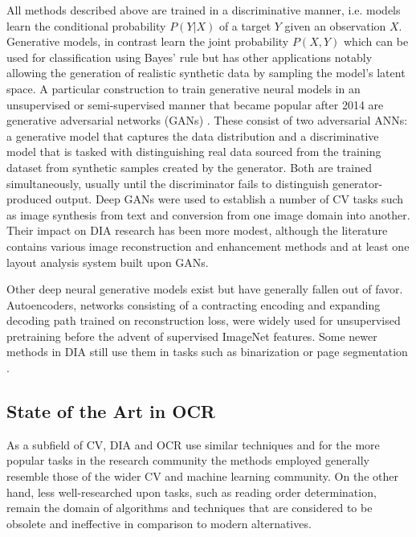 All methods described above are trained in a discriminative manner, i.e. models
learn the conditional probability $P(Y|X)$ of a target $Y$ given an observation
$X$. Generative models, in contrast learn the joint probability $P(X, Y)$ which
can be used for classification using Bayes' rule but has other applications
notably allowing the generation of realistic synthetic data by sampling the
model's latent space. A particular construction to train generative neural
models in an unsupervised or semi-supervised manner that became popular after
2014 are generative adversarial networks (GANs)
\cite{goodfellow2014generative}. These consist of two adversarial ANNs: a
generative model that captures the data distribution and a discriminative model
that is tasked with distinguishing real data sourced from the training dataset
from synthetic samples created by the generator. Both are trained
simultaneously, usually until the discriminator fails to distinguish
generator-produced output. Deep GANs were used to establish a number of CV
tasks such as image synthesis from text\cite{reed2016generative} and conversion
from one image domain into another\cite{CycleGAN2017}. Their impact on DIA
research has been more modest, although the literature contains various image
reconstruction and enhancement methods \cite{nguyen2019character,suh2020two}
and at least one layout analysis system \cite{quiros2018multi} built upon GANs.

Other deep neural generative models exist but have generally fallen out of
favor. Autoencoders, networks consisting of a contracting encoding and
expanding decoding path trained on reconstruction loss, were widely used for
unsupervised pretraining\cite{vincent2008extracting,erhan2010does} before the
advent of supervised ImageNet features. Some newer methods in DIA still use
them in tasks such as binarization \cite{calvo2019selectional} or page
segmentation \cite{chen2015page,wei2015selecting}. 

\subsection{State of the Art in OCR}
\label{s:soa}

As a subfield of CV, DIA and OCR use similar techniques and for the more
popular tasks in the research community the methods employed generally resemble
those of the wider CV and machine learning community. On the other hand, less
well-researched upon tasks, such as reading order determination, remain the
domain of algorithms and techniques that are considered to be obsolete and
ineffective in comparison to modern alternatives.

